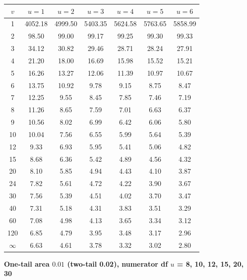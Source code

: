 \begin{center}
\small
\begin{tabular}{c|cccccc}
\toprule
$v$ & $u=1$ & $u=2$ & $u=3$ & $u=4$ & $u=5$ & $u=6$ \\
\midrule
1 & 4052.18 & 4999.50 & 5403.35 & 5624.58 & 5763.65 & 5858.99 \\
2 & 98.50 & 99.00 & 99.17 & 99.25 & 99.30 & 99.33 \\
3 & 34.12 & 30.82 & 29.46 & 28.71 & 28.24 & 27.91 \\
4 & 21.20 & 18.00 & 16.69 & 15.98 & 15.52 & 15.21 \\
5 & 16.26 & 13.27 & 12.06 & 11.39 & 10.97 & 10.67 \\
6 & 13.75 & 10.92 & 9.78 & 9.15 & 8.75 & 8.47 \\
7 & 12.25 & 9.55 & 8.45 & 7.85 & 7.46 & 7.19 \\
8 & 11.26 & 8.65 & 7.59 & 7.01 & 6.63 & 6.37 \\
9 & 10.56 & 8.02 & 6.99 & 6.42 & 6.06 & 5.80 \\
10 & 10.04 & 7.56 & 6.55 & 5.99 & 5.64 & 5.39 \\
12 & 9.33 & 6.93 & 5.95 & 5.41 & 5.06 & 4.82 \\
15 & 8.68 & 6.36 & 5.42 & 4.89 & 4.56 & 4.32 \\
20 & 8.10 & 5.85 & 4.94 & 4.43 & 4.10 & 3.87 \\
24 & 7.82 & 5.61 & 4.72 & 4.22 & 3.90 & 3.67 \\
30 & 7.56 & 5.39 & 4.51 & 4.02 & 3.70 & 3.47 \\
40 & 7.31 & 5.18 & 4.31 & 3.83 & 3.51 & 3.29 \\
60 & 7.08 & 4.98 & 4.13 & 3.65 & 3.34 & 3.12 \\
120 & 6.85 & 4.79 & 3.95 & 3.48 & 3.17 & 2.96 \\
$\infty$ & 6.63 & 4.61 & 3.78 & 3.32 & 3.02 & 2.80 \\
\bottomrule
\end{tabular}
\end{center}

\textbf{One-tail area $0.01$ (two-tail 0.02), numerator df $u$ = 8, 10, 12, 15, 20, 30}

